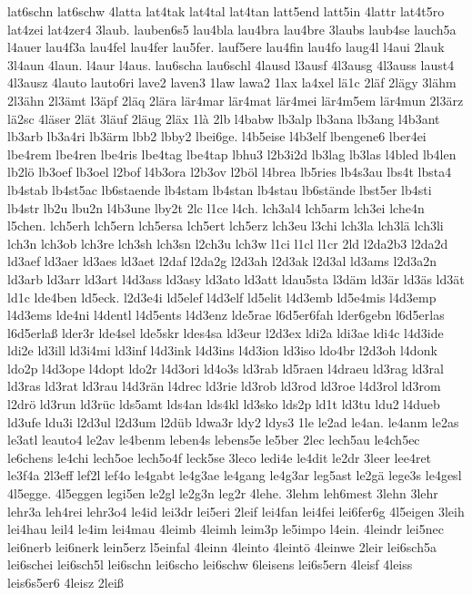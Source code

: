 {lat6schn
lat6schw
4latta
lat4tak
lat4tal
lat4tan
latt5end
latt5in
4lattr
lat4t5ro
lat4zei
lat4zer4
3laub.
lauben6s5
lau4bla
lau4bra
lau4bre
3laubs
laub4se
lauch5a
l4auer
lau4f3a
lau4fel
lau4fer
lau5fer.
lauf5ere
lau4fin
lau4fo
laug4l
l4aui
2lauk
3l4aun
4laun.
l4aur
l4aus.
lau6scha
lau6schl
4lausd
l3ausf
4l3ausg
4l3auss
laust4
4l3ausz
4lauto
lauto6ri
lave2
laven3
1law
lawa2
1lax
la4xel
lä1c
2läf
2lägy
3lähm
2l3ähn
2l3ämt
l3äpf
2läq
2lära
lär4mar
lär4mat
lär4mei
lär4m5em
lär4mun
2l3ärz
lä2sc
4läser
2lät
3läuf
2läug
2läx
1là
2lb
l4babw
lb3alp
lb3ana
lb3ang
l4b3ant
lb3arb
lb3a4ri
lb3ärm
lbb2
lbby2
lbei6ge.
l4b5eise
l4b3elf
lbengene6
lber4ei
lbe4rem
lbe4ren
lbe4ris
lbe4tag
lbe4tap
lbhu3
l2b3i2d
lb3lag
lb3las
l4bled
lb4len
lb2lö
lb3oef
lb3oel
l2bof
l4b3ora
l2b3ov
l2böl
l4brea
lb5ries
lb4s3au
lbs4t
lbsta4
lb4stab
lb4st5ac
lb6staende
lb4stam
lb4stan
lb4stau
lb6stände
lbst5er
lb4sti
lb4str
lb2u
lbu2n
l4b3une
lby2t
2lc
l1ce
l4ch.
lch3al4
lch5arm
lch3ei
lche4n
l5chen.
lch5erh
lch5ern
lch5ersa
lch5ert
lch5erz
lch3eu
l3chi
lch3la
lch3lä
lch3li
lch3n
lch3ob
lch3re
lch3sh
lch3sn
l2ch3u
lch3w
l1ci
l1cl
l1cr
2ld
l2da2b3
l2da2d
ld3aef
ld3aer
ld3aes
ld3aet
l2daf
l2da2g
l2d3ah
l2d3ak
l2d3al
ld3ams
l2d3a2n
ld3arb
ld3arr
ld3art
l4d3ass
ld3asy
ld3ato
ld3att
ldau5sta
l3däm
ld3är
ld3äs
ld3ät
ld1c
lde4ben
ld5eck.
l2d3e4i
ld5elef
l4d3elf
ld5elit
l4d3emb
ld5e4mis
l4d3emp
l4d3ems
lde4ni
l4dentl
l4d5ents
l4d3enz
lde5rae
l6d5er6fah
lder6gebn
l6d5erlas
l6d5erlaß
lder3r
lde4sel
lde5skr
ldes4sa
ld3eur
l2d3ex
ldi2a
ldi3ae
ldi4c
l4d3ide
ldi2e
ld3ill
ld3i4mi
ld3inf
l4d3ink
l4d3ins
l4d3ion
ld3iso
ldo4br
l2d3oh
l4donk
ldo2p
l4d3ope
l4dopt
ldo2r
l4d3ori
ld4o3s
ld3rab
ld5raen
l4draeu
ld3rag
ld3ral
ld3ras
ld3rat
ld3rau
l4d3rän
l4drec
ld3rie
ld3rob
ld3rod
ld3roe
l4d3rol
ld3rom
l2drö
ld3run
ld3rüc
lds5amt
lds4an
lds4kl
ld3sko
lds2p
ld1t
ld3tu
ldu2
l4dueb
ld3ufe
ldu3i
l2d3ul
l2d3um
l2düb
ldwa3r
ldy2
ldys3
1le
le2ad
le4an.
le4anm
le2as
le3atl
leauto4
le2av
le4benm
leben4s
lebens5e
le5ber
2lec
lech5au
le4ch5ec
le6chens
le4chi
lech5oe
lech5o4f
leck5se
3leco
ledi4e
le4dit
le2dr
3leer
lee4ret
le3f4a
2l3eff
lef2l
lef4o
le4gabt
le4g3ae
le4gang
le4g3ar
leg5ast
le2gä
lege3s
le4gesl
4l5egge.
4l5eggen
legi5en
le2gl
le2g3n
leg2r
4lehe.
3lehm
leh6mest
3lehn
3lehr
lehr3a
leh4rei
lehr3o4
le4id
lei3dr
lei5eri
2leif
lei4fan
lei4fei
lei6fer6g
4l5eigen
3leih
lei4hau
leil4
le4im
lei4mau
4leimb
4leimh
leim3p
le5impo
l4ein.
4leindr
lei5nec
lei6nerb
lei6nerk
lein5erz
l5einfal
4leinn
4leinto
4leintö
4leinwe
2leir
lei6sch5a
lei6schei
lei6sch5l
lei6schn
lei6scho
lei6schw
6leisens
lei6s5ern
4leisf
4leiss
leis6s5er6
4leisz
2leiß
}
